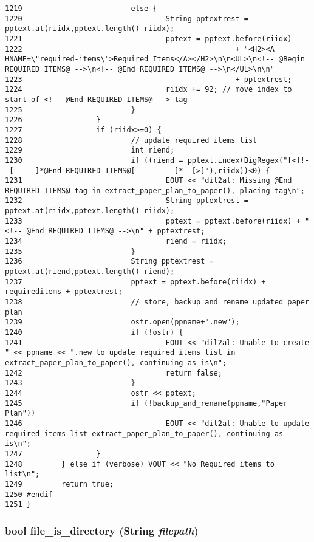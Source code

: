 \begin{verbatim}
1219                         else {
1220                                 String pptextrest = pptext.at(riidx,pptext.length()-riidx);
1221                                 pptext = pptext.before(riidx)
1222                                                 + "<H2><A HNAME=\"required-items\">Required Items</A></H2>\n\n<UL>\n<!-- @Begin REQUIRED ITEMS@ -->\n<!-- @End REQUIRED ITEMS@ -->\n</UL>\n\n"
1223                                                 + pptextrest;
1224                                 riidx += 92; // move index to start of <!-- @End REQUIRED ITEMS@ --> tag
1225                         }
1226                 }
1227                 if (riidx>=0) {
1228                         // update required items list
1229                         int riend;
1230                         if ((riend = pptext.index(BigRegex("[<]!--[     ]*@End REQUIRED ITEMS@[         ]*--[>]"),riidx))<0) {
1231                                 EOUT << "dil2al: Missing @End REQUIRED ITEMS@ tag in extract_paper_plan_to_paper(), placing tag\n";
1232                                 String pptextrest = pptext.at(riidx,pptext.length()-riidx);
1233                                 pptext = pptext.before(riidx) + "<!-- @End REQUIRED ITEMS@ -->\n" + pptextrest;
1234                                 riend = riidx;
1235                         }
1236                         String pptextrest = pptext.at(riend,pptext.length()-riend);
1237                         pptext = pptext.before(riidx) + requireditems + pptextrest;
1238                         // store, backup and rename updated paper plan
1239                         ostr.open(ppname+".new");
1240                         if (!ostr) {
1241                                 EOUT << "dil2al: Unable to create " << ppname << ".new to update required items list in extract_paper_plan_to_paper(), continuing as is\n";
1242                                 return false;
1243                         }
1244                         ostr << pptext;
1245                         if (!backup_and_rename(ppname,"Paper Plan"))
1246                                 EOUT << "dil2al: Unable to update required items list extract_paper_plan_to_paper(), continuing as is\n";
1247                 }
1248         } else if (verbose) VOUT << "No Required items to list\n";
1249         return true;
1250 #endif
1251 }
\end{verbatim}\normalsize 
{}
\subsubsection{\setlength{\rightskip}{0pt plus 5cm}bool file\_\-is\_\-directory ({\bf String} {\em filepath})}\label{dil2al_8hh_a232}




